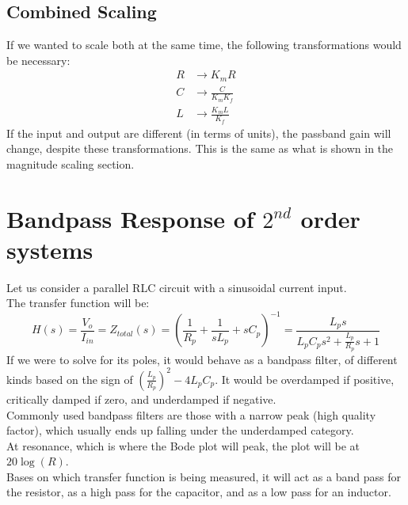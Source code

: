 \documentclass[nobib]{tufte-handout}
\begin{document}
\subsection{Combined Scaling}
If we wanted to scale both at the same time, the following transformations
would be necessary:
\begin{align*}
    R & \rightarrow K_mR             \\
    C & \rightarrow \frac{C}{K_mK_f} \\
    L & \rightarrow \frac{K_mL}{K_f}
\end{align*}
If the input and output are different (in terms of units), the passband gain will change, despite these transformations. This is the same as what is shown in the magnitude scaling section.
\section{Bandpass Response of $2^{nd}$ order systems}
Let us consider a parallel RLC circuit with a sinusoidal current input.\\
The transfer function will be:
\begin{equation*}
    H(s) = \frac{V_o}{I_{in}} = Z_{total}(s)= \left(\frac{1}{R_p}+\frac{1}{sL_p}+sC_p \right)^{-1} = \frac{L_p s}{L_p C_p s^2+ \frac{L_p}{R_p}s+1}
\end{equation*}
If we were to solve for its poles, it would behave as a bandpass filter, of different kinds based on the sign of $\left(\frac{L_p}{R_p}\right)^2 - 4L_pC_p$. It would be overdamped if positive, critically damped if zero, and underdamped if negative.\\
Commonly used bandpass filters are those with a narrow peak (high quality factor), which usually ends up falling under the underdamped category.\\
At resonance, which is where the Bode plot will peak, the plot will be at $20\log(R)$.\\
Bases on which transfer function is being measured, it will act as a band pass for the resistor, as a high pass for the capacitor, and as a low pass for an inductor.\\
\end{document}
